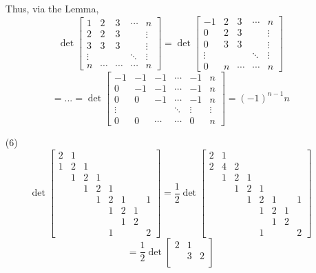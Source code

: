 \documentclass[12pt]{article}
\begin{document}
\begin{itemize}
Thus, via the Lemma,
$$\det\begin{bmatrix}
1 & 2 & 3 & \cdots & n \\
2 & 2 & 3 & & \vdots \\
3 & 3 & 3 & & \vdots \\
\vdots & & & \ddots & \vdots \\
n & \cdots & \cdots & \cdots & n
\end{bmatrix} = \det\begin{bmatrix}
-1 & 2 & 3 & \cdots & n \\
0 & 2 & 3 & & \vdots \\
0 & 3 & 3 & & \vdots \\
\vdots & & & \ddots & \vdots \\
0 & n & \cdots & \cdots & n
\end{bmatrix}$$
$$= ... = \det\begin{bmatrix}
-1 & -1 & -1 & \cdots & -1 & n \\
0 & -1 & -1 & \cdots & -1 & n \\
0 & 0 & -1 & \cdots & -1 & n \\
\vdots & & & \ddots & \vdots & \vdots \\
0 & 0 & \cdots & \cdots & 0 & n
\end{bmatrix} = (-1)^{n-1}n$$
\item[(6)]
$$\det\begin{bmatrix}
2 & 1 \\
1 & 2 & 1 \\
& 1 & 2 & 1 \\
& & 1 & 2 & 1 \\
& & & 1 & 2 & 1 & & 1\\
& & & & 1 & 2 & 1 \\
& & & & & 1 & 2 \\
& & & & 1 & & & 2
\end{bmatrix} = \frac{1}{2}\det\begin{bmatrix}
2 & 1 \\
2 & 4 & 2 \\
& 1 & 2 & 1 \\
& & 1 & 2 & 1 \\
& & & 1 & 2 & 1 & & 1\\
& & & & 1 & 2 & 1 \\
& & & & & 1 & 2 \\
& & & & 1 & & & 2
\end{bmatrix}$$
$$= \frac{1}{2}\det\begin{bmatrix}
2 & 1 \\
& 3 & 2 \\

\end{bmatrix}$$
\end{itemize}
\end{document}

